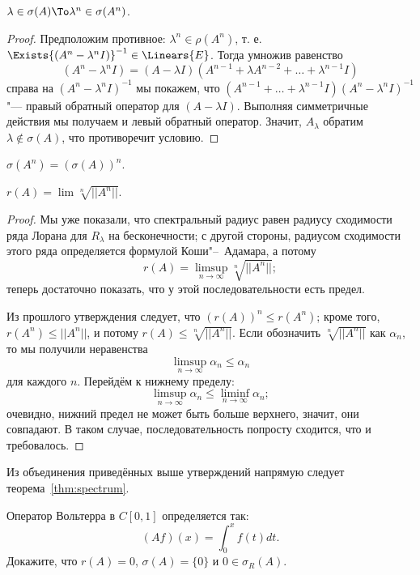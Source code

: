 \documentclass[main]{subfiles}
\begin{document}
\begin{proposition} %
  \( \lambda \in \sigma(A) \To \lambda^n \in \sigma(A^n) \).
\end{proposition}

\begin{proof}
  Предположим противное: \( \lambda^n \in \rho(A^n) \), т. е.
  \( \Exists {(A^n - \lambda^n I)}^{-1} \in \Linears{E} \).
  Тогда умножив равенство
  \[
    (A^n - \lambda^n I) = (A - \lambda I)
    (A^{n -1} + \lambda A^{n-2} + \dots + \lambda^{n-1} I)
  \]
  справа на \( {(A^n - \lambda^n I)}^{-1} \) мы покажем,
  что \( (A^{n -1} + \dots + \lambda^{n-1} I) {(A^n - \lambda^n I)}^{-1} \)
  "--- правый обратный оператор для \( (A - \lambda I) \).
  Выполняя симметричные действия мы получаем и левый обратный оператор.
  Значит, \( A_\lambda \) обратим \( \lambda \notin \sigma(A) \),
  что противоречит условию.
\end{proof}

\begin{exercise}
  \( \sigma(A^n) = {(\sigma(A))}^n \).
\end{exercise}

\begin{proposition}
  $ r(A) = \lim \sqrt[n]{||A^n||} $.
\end{proposition}
\begin{proof}
  Мы уже показали, что спектральный радиус равен радиусу сходимости
  ряда Лорана для \( R_\lambda \) на бесконечности;
  с другой стороны, радиусом сходимости этого ряда определяется
  формулой Коши"--~Адамара, а потому
  \[
    r(A) = \limsup_{n \to \infty} \sqrt[n]{||A^n||};
  \]
  теперь достаточно показать, что у этой последовательности есть предел.

  Из прошлого утверждения следует,
  что \( {\left( r(A) \right)}^n \le r(A^n) \);
  кроме того, \( r(A^n) \le ||A^n|| \),
  и потому \( r(A) \le \sqrt[n]{||A^n||} \).
  Если обозначить \( \sqrt[n]{||A^n||} \) как \( \alpha_n \),
  то мы получили неравенства
  \[
    \limsup_{n \to \infty} \alpha_n \le \alpha_n
  \]
  для каждого \( n \). Перейдём к нижнему пределу:
  \[
    \limsup_{n \to \infty} \alpha_n \le \liminf_{n \to \infty} \alpha_n;
  \]
  очевидно, нижний предел не может быть больше верхнего,
  значит, они совпадают. В таком случае,
  последовательность попросту сходится,
  что и требовалось.
\end{proof}

Из объединения приведённых выше утверждений
напрямую следует теорема~\ref{thm:spectrum}.

\begin{exercise}
  Оператор Вольтерра в \( C[0, 1] \) определяется так:
  \[ (Af)(x) = \int_{0}^x f(t) dt. \]
  Докажите, что \( r(A) = 0 \), \( \sigma(A) = \{ 0 \} \)
  и \( 0 \in \sigma_R(A) \).
\end{exercise}
 
\end{document}
